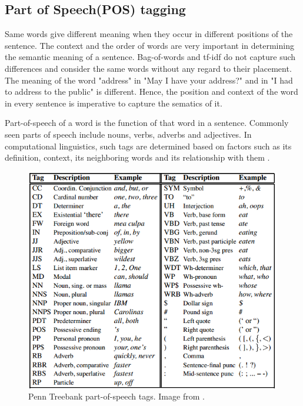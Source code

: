 	\subsection{Part of Speech(POS) tagging}
	
	Same words give different meaning when they occur in different positions of the sentence. The context and the order of words are very important in determining the semantic meaning of a sentence. Bag-of-words and tf-idf do not capture such differences and consider the same words without any regard to their placement. The meaning of the word "address" in "May I have your address?" and in "I had to address to the public" is different. Hence, the position and context of the word in every sentence is imperative to capture the sematics of it. 
	
	Part-of-speech of a word is the function of that word in a sentence. Commonly seen parts of speech include nouns, verbs, adverbs and adjectives. In computational linguistics, such tags are determined based on factors such as its definition, context, its neighboring words and its relationship with them \cite{pos_wiki}. 
	
	\begin{figure}[h!]
		\centering
		\includegraphics[scale=0.6]{images/penntagset}
		\caption{Penn Treebank part-of-speech tags. Image from \cite{jurafsky2014speech}.}
		\label{penntagset}
	\end{figure}
	
